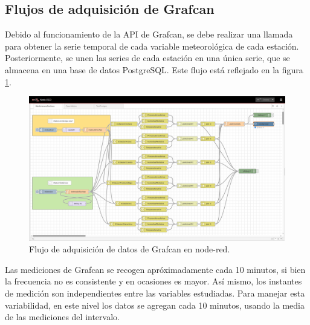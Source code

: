 \subsection{Flujos de adquisición de Grafcan}
Debido al funcionamiento de la API de Grafcan, se debe realizar una llamada para obtener la serie temporal de cada variable meteorológica de cada estación.
Posteriormente, se unen las series de cada estación en una única serie, que se almacena en una base de datos PostgreSQL. Este flujo está reflejado en la figura \ref{grafcan_flows}.
\begin{figure}[htb]
   \centering
   \includegraphics[width=1\linewidth]{images/node-red_grafcan.png}
   \caption{Flujo de adquisición de datos de Grafcan en node-red.}
   \label{grafcan_flows}
\end{figure}

Las mediciones de Grafcan se recogen apróximadamente cada 10 minutos, si bien la frecuencia no es consistente y en ocasiones es mayor. Así mismo, 
los instantes de medición son independientes entre las variables estudiadas. Para manejar esta variabilidad, 
en este nivel los datos se agregan cada 10 minutos, usando la media de las mediciones del intervalo.

